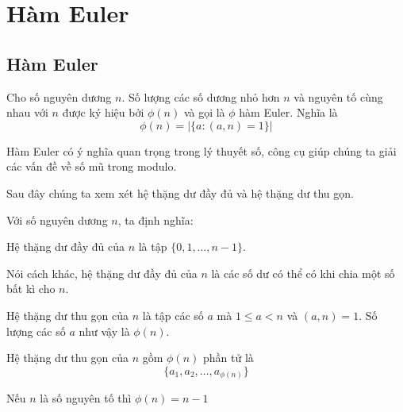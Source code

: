 \chapter{Hàm Euler}

\section{Hàm Euler}

\begin{definition}
    Cho số nguyên dương $n$. Số lượng các số dương nhỏ hơn $n$ và nguyên tố cùng nhau với $n$ được ký hiệu bởi $\phi(n)$ và gọi là $\phi$ hàm Euler. Nghĩa là
    \[\phi(n) = | \{ a : (a, n) = 1\} |\]
\end{definition}   

Hàm Euler có ý nghĩa quan trọng trong lý thuyết số, công cụ giúp chúng ta giải các vấn đề về số mũ trong modulo.

Sau đây chúng ta xem xét hệ thặng dư đầy đủ và hệ thặng dư thu gọn.

Với số nguyên dương $n$, ta định nghĩa:

\begin{definition}
    Hệ thặng dư đầy đủ của $n$ là tập $\{0, 1, \ldots, n-1\}$.
\end{definition}

Nói cách khác, hệ thặng dư đầy đủ của $n$ là các số dư có thể có khi chia một số bất kì cho $n$.


\begin{definition}
    Hệ thặng dư thu gọn của $n$ là tập các số $a$ mà $1 \leq a < n$ và $(a, n) = 1$. Số lượng các số $a$ như vậy là $\phi (n)$.  
\end{definition}


\begin{remark}
    Hệ thặng dư thu gọn của $n$ gồm $\phi(n)$ phần tử là $$\{a_1, a_2, \ldots, a_{\phi(n)}\}$$
\end{remark}

\begin{remark}
    Nếu $n$ là số nguyên tố thì $\phi(n) = n-1$
\end{remark}

